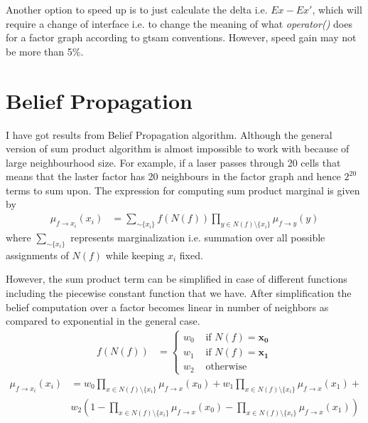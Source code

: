 \documentclass[10pt,oneside,letterpaper]{article}
\begin{document}
Another option to speed up is to just calculate the delta i.e. $Ex - Ex'$, which will require a change of interface i.e. to change the meaning of what \emph{operator()} does for a factor graph according to gtsam conventions. However, speed gain may not be more than 5\%.

\section{Belief Propagation}
I have got results from Belief Propagation algorithm. 
Although the general version of sum product algorithm is almost impossible to work with because of large neighbourhood size. For example, if a laser passes through 20 cells that means that the laster factor has 20 neighbours in the factor graph and hence $2^{20}$ terms to sum upon. The expression for computing sum product marginal is given by
\begin{align}
  \mu_{f \rightarrow x_i}(x_i) &= \sum_{\sim\{x_i\}} f(N(f)) \prod_{y \in N(f) \setminus \{x_i\}} \mu_{f \rightarrow y}(y)
\end{align}
where $\sum_{\sim\{x_i\}}$ represents marginalization i.e. summation over all possible assignments of $N(f)$ while keeping $x_i$ fixed.

However, the sum product term can be simplified in case of different functions including the piecewise constant function that we have. After simplification the belief computation over a factor becomes linear in number of neighbors as compared to exponential in the general case.
\begin{align}
  f(N(f)) &= \begin{cases}
       w_0 & \text{ if } N(f) = \mathbf{x_{0}}\\
       w_1 & \text{ if } N(f) = \mathbf{x_{1}}\\
       w_2 & \text{ otherwise}
  \end{cases}
\end{align}
\begin{align}
  \mu_{f \rightarrow x_i}(x_i) &= 
    w_0 \prod_{x \in N(f) \setminus \{x_i\}} \mu_{f \rightarrow x}(x_{0})  +
    w_1 \prod_{x \in N(f) \setminus \{x_i\}} \mu_{f \rightarrow x}(x_{1}) +\\
    & w_2 \left(1 - \prod_{x \in N(f) \setminus \{x_i\}} \mu_{f \rightarrow x}(x_{0})
    - \prod_{x \in N(f) \setminus \{x_i\}} \mu_{f \rightarrow x}(x_{1})\right) 
\end{align}
\end{document}
